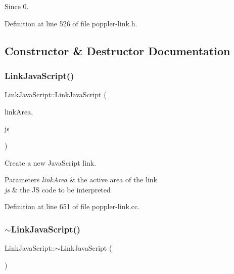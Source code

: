 \begin{DoxySince}{Since}
0. 
\end{DoxySince}


Definition at line 526 of file poppler-\/link.\+h.



\subsection{Constructor \& Destructor Documentation}
\mbox{\label{class_poppler_1_1_link_java_script_af80931f63d3a9793111609badb99faa9}} 
\subsubsection{\texorpdfstring{Link\+Java\+Script()}{LinkJavaScript()}}
{\footnotesize\ttfamily Link\+Java\+Script\+::\+Link\+Java\+Script (\begin{DoxyParamCaption}\item[{const Q\+RectF \&}]{link\+Area,  }\item[{const Q\+String \&}]{js }\end{DoxyParamCaption})}

Create a new Java\+Script link.


\begin{DoxyParams}{Parameters}
{\em link\+Area} & the active area of the link \\
\hline
{\em js} & the JS code to be interpreted \\
\hline
\end{DoxyParams}


Definition at line 651 of file poppler-\/link.\+cc.

\mbox{\label{class_poppler_1_1_link_java_script_a1462b44d39525ee518ea291c481f787d}} 
\subsubsection{\texorpdfstring{$\sim$\+Link\+Java\+Script()}{~LinkJavaScript()}}
{\footnotesize\ttfamily Link\+Java\+Script\+::$\sim$\+Link\+Java\+Script (\begin{DoxyParamCaption}{ }\end{DoxyParamCaption})\hspace{0.3cm}{\ttfamily [virtual]}}

